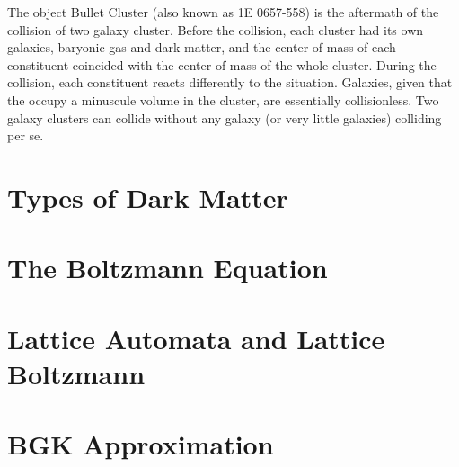 The object Bullet Cluster (also known as 1E 0657-558) is the aftermath of the collision of two galaxy cluster.
Before the collision, each cluster had its own galaxies, baryonic gas and dark matter, and the center of mass of each constituent coincided with the center of mass of the whole cluster.
During the collision, each constituent reacts differently to the situation.
Galaxies, given that the occupy a minuscule volume in the cluster, are essentially collisionless. Two galaxy clusters can collide without any galaxy (or very little galaxies) colliding per se.\\






\section{Types of Dark Matter}

\section{The Boltzmann Equation}

\section{Lattice Automata and Lattice Boltzmann}

\section{BGK Approximation}
\label{bgk}
